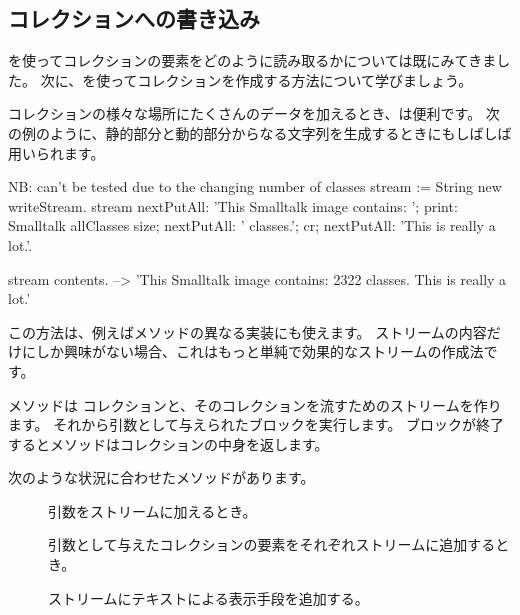 \documentclass[a4paper,10pt,twoside]{book}
\begin{document}
\subsection{コレクションへの書き込み}

を使ってコレクションの要素をどのように読み取るかについては既にみてきました。
次に、を使ってコレクションを作成する方法について学びましょう。


コレクションの様々な場所にたくさんのデータを加えるとき、は便利です。
次の例のように、静的部分と動的部分からなる文字列を生成するときにもしばしば用いられます。


\begin{code}{NB: can't be tested due to the changing number of classes}
stream := String new writeStream.
stream
  nextPutAll: 'This Smalltalk image contains: ';
  print: Smalltalk allClasses size;
  nextPutAll: ' classes.';
  cr;
  nextPutAll: 'This is really a lot.'.

stream contents. --> 'This Smalltalk image contains: 2322 classes.
This is really a lot.'
\end{code}

この方法は、例えばメソッドの異なる実装にも使えます。
ストリームの内容だけにしか興味がない場合、これはもっと単純で効果的なストリームの作成法です。


 メソッドは
コレクションと、そのコレクションを流すためのストリームを作ります。
それから引数として与えられたブロックを実行します。
ブロックが終了するとメソッドはコレクションの中身を返します。

次のような状況に合わせたメソッドがあります。

\begin{description}
\item[] 引数をストリームに加えるとき。
\item[] 引数として与えたコレクションの要素をそれぞれストリームに追加するとき。
\item[] ストリームにテキストによる表示手段を追加する。
\end{description}
\end{document}
